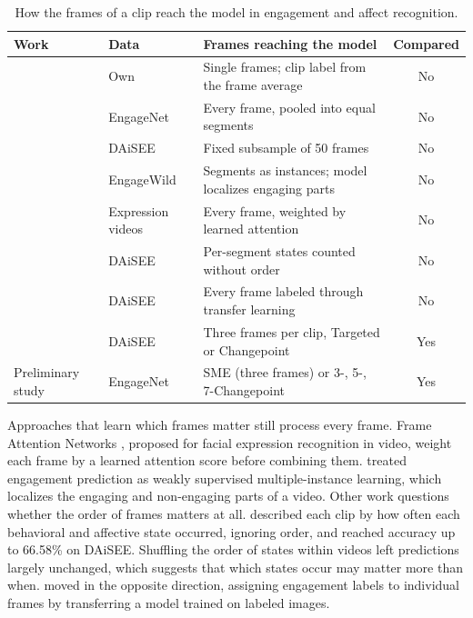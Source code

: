\begin{table}[t]
   \centering
   \caption[How frames reach the model]{How the frames of a clip reach the model in engagement and affect recognition.}
   \label{tab:rw-frameuse}
   \small
   \begin{tabular}{L{3.2cm}L{2.1cm}L{5.4cm}c}
      \toprule
      Work & Data & Frames reaching the model & Compared \\
      \midrule
       & Own & Single frames; clip label from the frame average & No \\
       & EngageNet & Every frame, pooled into equal segments & No \\
       & DAiSEE & Fixed subsample of 50 frames & No \\
       & EngageWild & Segments as instances; model localizes engaging parts & No \\
       & Expression videos & Every frame, weighted by learned attention & No \\
       & DAiSEE & Per-segment states counted without order & No \\
       & DAiSEE & Every frame labeled through transfer learning & No \\
       & DAiSEE & Three frames per clip, Targeted or Changepoint & Yes \\
      Preliminary study \cite{sityar2026icce} & EngageNet & SME (three frames) or 3-, 5-, 7-Changepoint & Yes \\
      \bottomrule
   \end{tabular}
\end{table}

Approaches that learn which frames matter still process every frame. Frame Attention Networks \cite{meng2019}, proposed for facial expression recognition in video, weight each frame by a learned attention score before combining them.  treated engagement prediction as weakly supervised multiple-instance learning, which localizes the engaging and non-engaging parts of a video. Other work questions whether the order of frames matters at all.  described each clip by how often each behavioral and affective state occurred, ignoring order, and reached accuracy up to 66.58\% on DAiSEE. Shuffling the order of states within videos left predictions largely unchanged, which suggests that which states occur may matter more than when.  moved in the opposite direction, assigning engagement labels to individual frames by transferring a model trained on labeled images.

